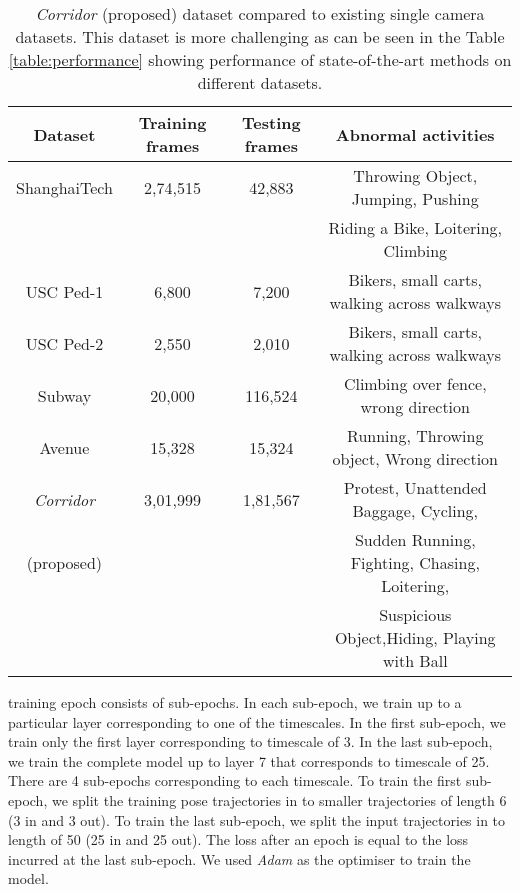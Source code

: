 \documentclass[conference]{IEEEtran}
\begin{document}
\begin{table*}
\centering
\def\arraystretch{1.2}
\begin{tabular}{ | c | c | c | c | } 
 \hline
  \textbf{Dataset} &  \textbf{Training frames} & \textbf{Testing frames} & \textbf{Abnormal activities}\\ 
  \hline
 ShanghaiTech \cite{TSC-RNN} & 2,74,515 & 42,883 & Throwing Object, Jumping, Pushing\\
  & & & Riding a Bike, Loitering, Climbing\\
 \hline
 USC Ped-1 \cite{li2013anomaly} & 6,800 & 7,200
 & Bikers, small carts, walking across walkways\\
 \hline
 USC Ped-2 \cite{li2013anomaly} & 2,550 & 2,010 
 & Bikers, small carts, walking across walkways\\
 \hline
 Subway \cite{adam2008robust} & 20,000 & 116,524 & Climbing over fence, wrong direction\\
 \hline
 Avenue \cite{Avenue}&  15,328 & 15,324 & Running, Throwing object, Wrong direction\\
 \hline
 \textit{Corridor} & 3,01,999 &  1,81,567 & {Protest, Unattended Baggage, Cycling,} \\
 (proposed) & & & { Sudden Running, Fighting, Chasing, Loitering,}\\
 & & & {Suspicious Object,Hiding, Playing with Ball} \\
 \hline

\end{tabular}
\vspace{10pt}
\caption{ \textit{Corridor} (proposed) dataset compared to existing single camera datasets. This dataset is more challenging as can be seen in the Table \ref{table:performance} showing performance of state-of-the-art methods on different datasets.}
\label{table:iitb}
\end{table*}
training epoch consists of sub-epochs. In each sub-epoch, we train up to a particular layer corresponding to one of the timescales. In the first sub-epoch, we train only the first layer corresponding to timescale of 3. In the last sub-epoch, we train the complete model up to layer 7 that corresponds to timescale of 25. There are 4 sub-epochs corresponding to each timescale. To train the first sub-epoch, we split the training pose trajectories in to smaller trajectories of length 6 (3 in and 3 out). To train the last sub-epoch, we split the input trajectories in to length of 50 (25 in and 25 out). The loss after an epoch is equal to the loss incurred at the last sub-epoch. We used \textit{Adam} as the optimiser to train the model.  
\end{document}
